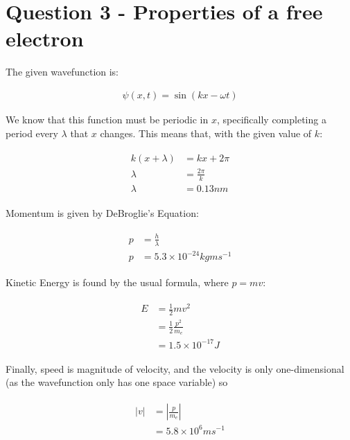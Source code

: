 \documentclass[paper=a4, fontsize=12pt]{scrartcl}
\begin{document}
\section{Question 3 - Properties of a free electron}

The given wavefunction is:

\begin{align*}
\psi(x, t) = \sin(kx - \omega t)
\end{align*}

We know that this function must be periodic in $x$, specifically completing a period every $\lambda$ that $x$ changes. This means that, with the given value of $k$:

\begin{align*}
\begin{split}
k(x + \lambda) &= kx + 2\pi\\
\lambda &= \frac{2 \pi}{k}\\
\lambda &= 0.13 nm
\end{split}
\end{align*}

Momentum is given by DeBroglie's Equation:

\begin{align*}
\begin{split}
p &= \frac{h}{\lambda}\\
p &= 5.3 \times 10^{-24} kg m s^{-1}
\end{split}
\end{align*}

Kinetic Energy is found by the usual formula, where $p = mv$:

\begin{align*}
\begin{split}
E &= \frac{1}{2}m v^2\\
&= \frac{1}{2} \frac{p^2}{m_e}\\
&= 1.5 \times 10^{-17} J
\end{split}
\end{align*}

Finally, speed is magnitude of velocity, and the velocity is only one-dimensional (as the wavefunction only has one space variable) so

\begin{align*}
\begin{split}
|v| &= |\frac{p}{m_e}|\\
&= 5.8 \times 10^6 m s^{-1}
\end{split}
\end{align*}
\end{document}
